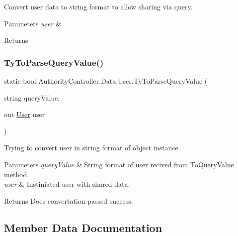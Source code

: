Convert user data to string format to allow sharing via query. 


\begin{DoxyParams}{Parameters}
{\em user} & \\
\hline
\end{DoxyParams}
\begin{DoxyReturn}{Returns}

\end{DoxyReturn}
\mbox{\label{class_authority_controller_1_1_data_1_1_user_adb8253e5d75b65467e42fcf243eeb991}} 
\subsubsection{\texorpdfstring{Ty\+To\+Parse\+Query\+Value()}{TyToParseQueryValue()}}
{\footnotesize\ttfamily static bool Authority\+Controller.\+Data.\+User.\+Ty\+To\+Parse\+Query\+Value (\begin{DoxyParamCaption}\item[{string}]{query\+Value,  }\item[{out \mbox{\hyperlink{class_authority_controller_1_1_data_1_1_user}{User}}}]{user }\end{DoxyParamCaption})\hspace{0.3cm}{\ttfamily [static]}}



Trying to convert user in string format of object instance. 


\begin{DoxyParams}{Parameters}
{\em query\+Value} & String format of user recived from To\+Query\+Value method.\\
\hline
{\em user} & Instiniated user with shared data.\\
\hline
\end{DoxyParams}
\begin{DoxyReturn}{Returns}
Does convertation passed success.
\end{DoxyReturn}


\subsection{Member Data Documentation}
\mbox{\label{class_authority_controller_1_1_data_1_1_user_a2b446b542b04e20debd43d5107ded674}} 

